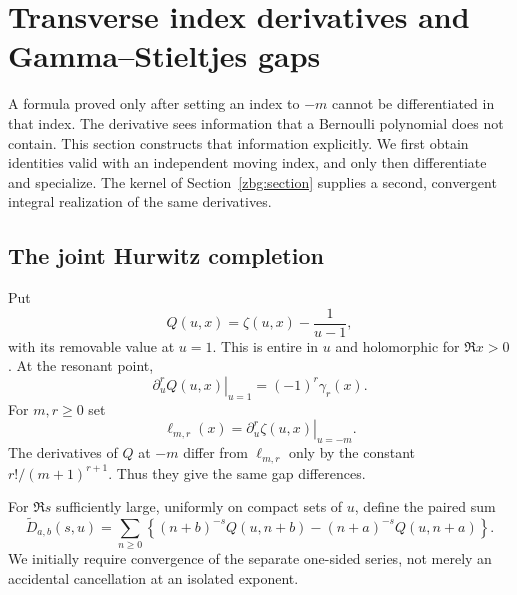 \documentclass[11pt,letterpaper]{article}
\numberwithin{equation}{section}
\theoremstyle{plain}
\theoremstyle{definition}
\theoremstyle{remark}
\begin{document}

\section{Transverse index derivatives and Gamma--Stieltjes gaps}
\label{tr:section}

A formula proved only after setting an index to $-m$ cannot be
differentiated in that index. The derivative sees information that a
Bernoulli polynomial does not contain. This section constructs that
information explicitly. We first obtain identities valid with an
independent moving index, and only then differentiate and specialize.
The kernel of Section~\ref{zbg:section} supplies a second, convergent
integral realization of the same derivatives.

\subsection{The joint Hurwitz completion}

Put
\begin{equation}\label{tr:Q}
 Q(u,x)=\zeta(u,x)-\frac1{u-1},
\end{equation}
with its removable value at $u=1$. This is entire in $u$ and holomorphic
for $\Re x>0$. At the resonant point,
\begin{equation}\label{tr:Qstieltjes}
 \left.\partial_u^rQ(u,x)\right|_{u=1}=(-1)^r\gamma_r(x).
\end{equation}
For $m,r\geq0$ set
\begin{equation}\label{tr:ell}
 \ell_{m,r}(x)=\left.\partial_u^r\zeta(u,x)\right|_{u=-m}.
\end{equation}
The derivatives of $Q$ at $-m$ differ from $\ell_{m,r}$ only by the
constant $r!/(m+1)^{r+1}$. Thus they give the same gap differences.

For $\Re s$ sufficiently large, uniformly on compact sets of $u$,
define the paired sum
\begin{equation}\label{tr:Dtilde}
 \widetilde D_{a,b}(s,u)=
 \sum_{n\geq0}\left\{
 (n+b)^{-s}Q(u,n+b)-(n+a)^{-s}Q(u,n+a)\right\}.
\end{equation}
We initially require convergence of the separate one-sided series,
not merely an accidental cancellation at an isolated exponent.
\end{document}
